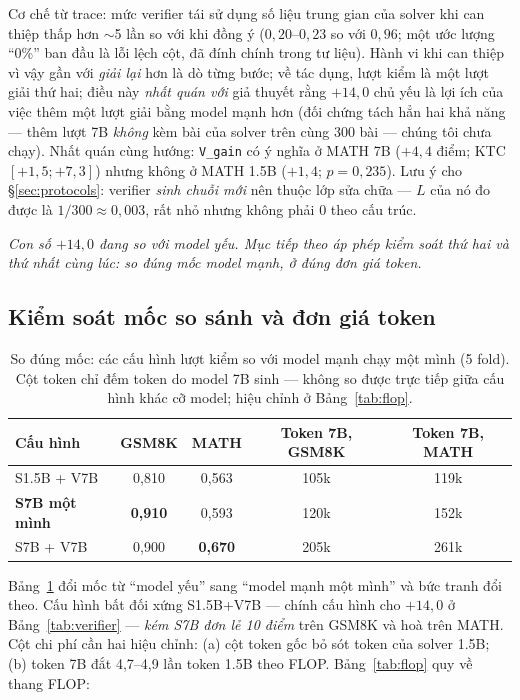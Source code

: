 \documentclass[11pt,a4paper]{article}
\begin{document}
Cơ chế từ trace: mức verifier tái sử dụng số liệu trung gian của solver khi can thiệp thấp
hơn $\sim$5 lần so với khi đồng ý ($0{,}20$--$0{,}23$ so với $0{,}96$; một ước lượng ``0\%''
ban đầu là lỗi lệch cột, đã đính chính trong tư liệu). Hành vi khi can thiệp vì vậy gần với
\emph{giải lại} hơn là dò từng bước; về tác dụng, lượt kiểm là một lượt giải thứ hai;
điều này \emph{nhất quán với} giả thuyết rằng $+14{,}0$ chủ yếu là lợi ích của việc thêm một
lượt giải bằng model mạnh hơn (đối chứng tách hẳn hai khả năng --- thêm lượt 7B \emph{không}
kèm bài của solver trên cùng 300 bài --- chúng tôi chưa chạy). Nhất quán cùng hướng:
\texttt{V\_gain} có ý nghĩa ở MATH 7B ($+4{,}4$ điểm; KTC $[+1{,}5;+7{,}3]$) nhưng không ở
MATH 1.5B ($+1{,}4$; $p=0{,}235$). Lưu ý cho \S\ref{sec:protocols}: verifier \emph{sinh chuỗi
mới} nên thuộc lớp sửa chữa --- $L$ của nó đo được là $1/300 \approx 0{,}003$, rất nhỏ nhưng
không phải 0 theo cấu trúc.

\emph{Con số $+14{,}0$ đang so với model yếu. Mục tiếp theo áp phép kiểm soát thứ hai và thứ
nhất cùng lúc: so đúng mốc model mạnh, ở đúng đơn giá token.}

\subsection{Kiểm soát mốc so sánh và đơn giá token}\label{sec:baseline}

\begin{table}[t]\centering\small
\begin{tabular}{lcccc}\toprule
Cấu hình & GSM8K & MATH & Token 7B, GSM8K & Token 7B, MATH\\\midrule
S1.5B + V7B & 0,810 & 0,563 & 105k & 119k\\
\textbf{S7B một mình} & \textbf{0,910} & 0,593 & 120k & 152k\\
S7B + V7B & 0,900 & \textbf{0,670} & 205k & 261k\\\bottomrule
\end{tabular}
\caption{So đúng mốc: các cấu hình lượt kiểm so với model mạnh chạy một mình (5 fold). Cột
token chỉ đếm token do model 7B sinh --- không so được trực tiếp giữa cấu hình khác cỡ model;
hiệu chỉnh ở Bảng~\ref{tab:flop}.}
\label{tab:baseline}
\end{table}

Bảng~\ref{tab:baseline} đổi mốc từ ``model yếu'' sang ``model mạnh một mình'' và bức tranh đổi
theo. Cấu hình bất đối xứng S1.5B+V7B --- chính cấu hình cho $+14{,}0$ ở
Bảng~\ref{tab:verifier} --- \emph{kém S7B đơn lẻ 10 điểm} trên GSM8K và hoà trên MATH. Cột chi
phí cần hai hiệu chỉnh: (a) cột token gốc bỏ sót token của solver 1.5B; (b) token 7B đắt
4,7--4,9 lần token 1.5B theo FLOP. Bảng~\ref{tab:flop} quy về thang FLOP:
\end{document}
